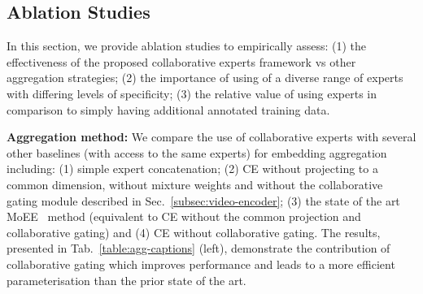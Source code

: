 \documentclass{bmvc2k}
\begin{document}
  \subsection{Ablation Studies} \label{subsec:ablations}

In this section, we provide ablation studies to empirically assess: (1) the effectiveness of the proposed collaborative experts framework vs other aggregation strategies; (2) the importance of using of a diverse range of experts with differing levels of specificity; (3) the relative value of using experts in comparison to simply having additional annotated training data.

\noindent \textbf{Aggregation method:} We compare the use of collaborative experts with several other baselines (with access to the same experts) for embedding aggregation including: (1) simple expert concatenation; (2) CE without projecting to a common dimension, without mixture weights and without the collaborative gating module described in Sec.~\ref{subsec:video-encoder}; (3) the state of the art MoEE~\cite{miech2018learning} method (equivalent to CE without the common projection and collaborative gating) and (4) CE without collaborative gating.  The results, presented in Tab.~\ref{table:agg-captions} (left), demonstrate the contribution of collaborative gating which improves performance and leads to a more efficient parameterisation than the prior state of the art. 
\end{document}
